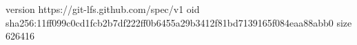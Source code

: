 version https://git-lfs.github.com/spec/v1
oid sha256:11ff099c0cd1fcb2b7df222ff0b6455a29b3412f81bd7139165f084eaa88abb0
size 626416
